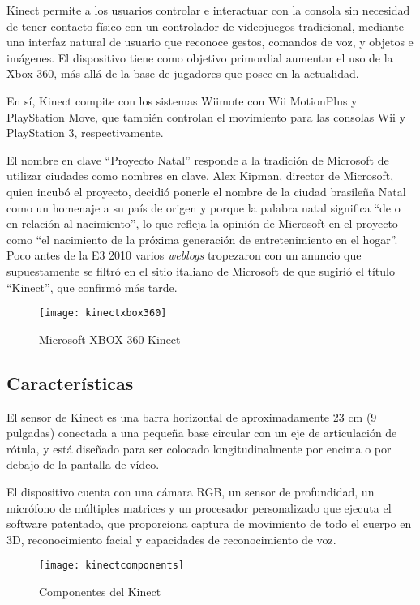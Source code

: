 Kinect permite a los usuarios controlar e interactuar con la consola sin necesidad de tener contacto físico con un controlador de videojuegos tradicional, mediante una interfaz natural de usuario que reconoce gestos, comandos de voz, y objetos e imágenes. El dispositivo tiene como objetivo primordial aumentar el uso de la Xbox 360, más allá de la base de jugadores que posee en la actualidad.

En sí, Kinect compite con los sistemas Wiimote con Wii MotionPlus y PlayStation Move, que también controlan el movimiento para las consolas Wii y PlayStation 3, respectivamente.

El nombre en clave ``Proyecto Natal'' responde a la tradición de Microsoft de utilizar ciudades como nombres en clave. Alex Kipman, director de Microsoft, quien incubó el proyecto, decidió ponerle el nombre de la ciudad brasileña Natal como un homenaje a su país de origen y porque la palabra natal significa ``de o en relación al nacimiento'', lo que refleja la opinión de Microsoft en el proyecto como ``el nacimiento de la próxima generación de entretenimiento en el hogar''. Poco antes de la E3 2010 varios \textit{weblogs} tropezaron con un anuncio que supuestamente se filtró en el sitio italiano de Microsoft de que sugirió el título ``Kinect'', que confirmó más tarde.

\begin{figure}[h]
\centering
\texttt{[image: kinectxbox360]}
\caption{Microsoft XBOX 360 Kinect}
\end{figure}

\subsection{Características}
El sensor de Kinect es una barra horizontal de aproximadamente 23 cm (9 pulgadas) conectada a una pequeña base circular con un eje de articulación de rótula, y está diseñado para ser colocado longitudinalmente por encima o por debajo de la pantalla de vídeo.

El dispositivo cuenta con una cámara RGB, un sensor de profundidad, un micrófono de múltiples matrices y un procesador personalizado que ejecuta el software patentado, que proporciona captura de movimiento de todo el cuerpo en 3D, reconocimiento facial y capacidades de reconocimiento de voz.

\begin{figure}[h]
\centering
\texttt{[image: kinectcomponents]}
\caption{Componentes del Kinect}
\end{figure}

